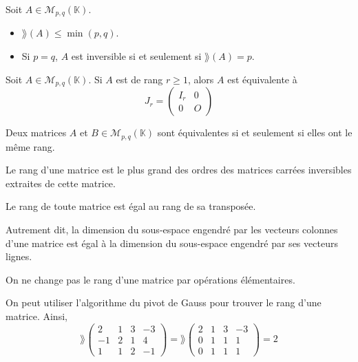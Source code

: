   \begin{remark}
    Soit $A \in \mathcal{M}_{p,q}(\mathbb{K})$.
    \begin{itemize}
      \item $\rang(A) \leq \min(p, q)$.
      \item Si $p = q$, $A$ est inversible si et seulement si $\rang(A) = p$.
    \end{itemize}
  \end{remark}

  \begin{theorem}
    Soit $A \in \mathcal{M}_{p,q}(\mathbb{K})$. Si $A$ est de rang $r \geq 1$, alors $A$ est équivalente à
    \[ J_r =
    \begin{pmatrix}
      I_r & 0 \\
      0 & O
    \end{pmatrix}
    \]
  \end{theorem}

  \begin{corollary}
    Deux matrices $A$ et $B \in \mathcal{M}_{p,q}(\mathbb{K})$ sont équivalentes si et seulement si elles ont le même rang.
  \end{corollary}

  \begin{theorem}
    Le rang d'une matrice est le plus grand des ordres des matrices carrées inversibles extraites de cette matrice.
  \end{theorem}

  \begin{corollary}
    Le rang de toute matrice est égal au rang de sa transposée.
  \end{corollary}

  \begin{remark}
    Autrement dit, la dimension du sous-espace engendré par les vecteurs colonnes d'une matrice est égal à la dimension du sous-espace engendré par ses vecteurs lignes.
  \end{remark}

  \begin{proposition}
    On ne change pas le rang d'une matrice par opérations élémentaires.
  \end{proposition}

  \begin{example}
    On peut utiliser l'algorithme du pivot de Gauss pour trouver le rang d'une matrice. Ainsi,
    \[ \rang
    \begin{pmatrix}
      2 & 1 & 3 & -3 \\
      -1 & 2 & 1 & 4 \\
      1 & 1 & 2 & -1
    \end{pmatrix}
    = \rang
    \begin{pmatrix}
      2 & 1 & 3 & -3 \\
      0 & 1 & 1 & 1 \\
      0 & 1 & 1 & 1
    \end{pmatrix}
    = 2 \]
  \end{example}

